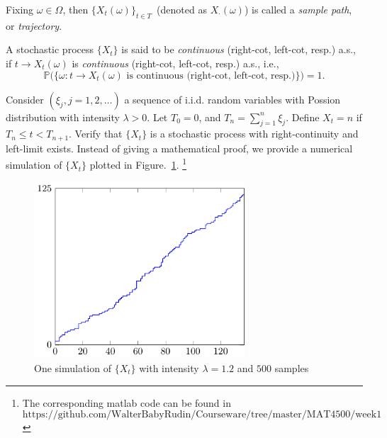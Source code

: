\begin{definition}
Fixing $\omega\in\Omega$, then $\{X_t(\omega)\}_{t\in T}$~(denoted as $X_{\cdot}(\omega)$) is called a \emph{sample path}, or \emph{trajectory}. 
\end{definition}
\begin{definition}[Continuous]
A stochastic process $\{X_t\}$ is said to be \emph{continuous} (right-cot, left-cot, resp.) a.s., if
$t\to X_t(\omega)$ is \emph{continuous} (right-cot, left-cot, resp.) a.s., i.e.,
\[
\mathbb{P}
\bigg(
\{
\omega: t\to X_t(\omega)\text{ is continuous (right-cot, left-cot, resp.)}
\}
\bigg)=1.
\]
\end{definition}

\begin{example}
Consider $(\xi_j, j=1,2,\ldots)$ a sequence of i.i.d. random variables with Possion distribution with intensity $\lambda>0$.
Let $T_0=0$, and $T_n = \sum_{j=1}^n\xi_j$.
Define $X_t = n$ if $T_n \le t< T_{n+1}$.
Verify that $\{X_t\}$ is a stochastic process with right-continuity and left-limit exists.
Instead of giving a mathematical proof, we provide a numerical simulation of $\{X_t\}$ plotted in Figure.~\ref{fig:1:1}.
\footnote{The corresponding matlab code can be found in 
\[
\mbox{https://github.com/WalterBabyRudin/Courseware/tree/master/MAT4500/week1}
\]}
\end{example}
\begin{figure}
\centering
\includegraphics[width=0.7\textwidth]{week1/figure_2.pdf}
\caption{One simulation of $\{X_t\}$ with intensity $\lambda=1.2$ and $500$ samples}
\label{fig:1:1}
\end{figure}














